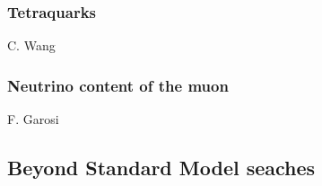 \documentclass{FBR_Bericht_2025}
\begin{document}
\begin{refsection}
\subsubsection{Tetraquarks}
\begin{Namen}
C. Wang
\end{Namen}
%
\subsubsection{Neutrino content of the muon}
\begin{Namen}
F. Garosi
\end{Namen}
\printbibliography[heading=subbibliography]
\end{refsection}

\subsection{Beyond Standard Model seaches}
\end{document}
